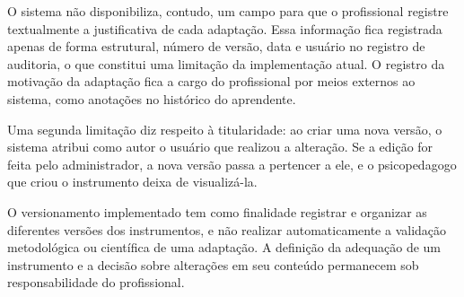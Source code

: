 O sistema não disponibiliza, contudo, um campo para que o profissional registre textualmente a justificativa de cada adaptação. Essa informação fica registrada apenas de forma estrutural, número de versão, data e usuário no registro de auditoria, o que constitui uma limitação da implementação atual. O registro da motivação da adaptação fica a cargo do profissional por meios externos ao sistema, como anotações no histórico do aprendente.

Uma segunda limitação diz respeito à titularidade: ao criar uma nova versão, o sistema atribui como autor o usuário que realizou a alteração. Se a edição for feita pelo administrador, a nova versão passa a pertencer a ele, e o psicopedagogo que criou o instrumento deixa de visualizá-la.

O versionamento implementado tem como finalidade registrar e organizar as diferentes versões dos instrumentos, e não realizar automaticamente a validação metodológica ou científica de uma adaptação. A definição da adequação de um instrumento e a decisão sobre alterações em seu conteúdo permanecem sob responsabilidade do profissional.